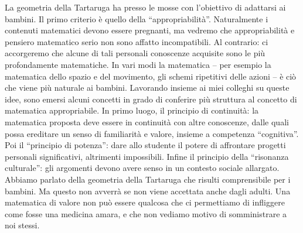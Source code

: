 La geometria della Tartaruga ha presso le mosse con l'obiettivo di adattarsi ai bambini. Il primo criterio è quello della “appropriabilità”. Naturalmente i contenuti matematici devono essere pregnanti, ma vedremo che appropriabilità e pensiero matematico serio non sono affatto incompatibili. Al contrario: ci accorgeremo che alcune di tali personali conoscenze acquisite sono le più profondamente matematiche. In vari modi la matematica – per esempio la matematica dello spazio e del movimento, gli schemi ripetitivi delle azioni – è ciò che viene più naturale ai bambini. Lavorando insieme ai miei colleghi su queste idee, sono emersi alcuni concetti in grado di conferire più struttura al concetto di matematica appropriabile. In primo luogo, il principio di continuità: la matematica proposta deve essere in continuità con altre conoscenze, dalle quali possa ereditare un senso di familiarità e valore, insieme a competenza “cognitiva”. Poi il “principio di potenza”: dare allo studente il potere di affrontare progetti personali significativi, altrimenti impossibili. Infine il principio della “risonanza culturale”: gli argomenti devono avere senso in un contesto sociale allargato. Abbiamo parlato della geometria della Tartaruga che risulti comprensibile per i bambini. Ma questo non avverrà se non viene accettata anche dagli adulti. Una matematica di valore non può essere qualcosa che ci permettiamo di infliggere come fosse una medicina amara, e che non vediamo motivo di somministrare a noi stessi.












